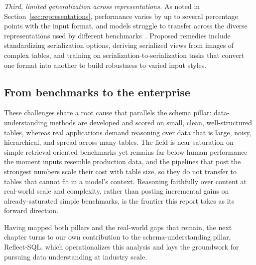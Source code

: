 \emph{Third, limited generalization across representations.} As noted in Section~\ref{sec:representations}, performance varies by up to several percentage points with the input format, and models struggle to transfer across the diverse representations used by different benchmarks~\cite{sui2024table}. Proposed remedies include standardizing serialization options, deriving serialized views from images of complex tables, and training on serialization-to-serialization tasks that convert one format into another to build robustness to varied input styles.

\subsection{From benchmarks to the enterprise}
These challenges share a root cause that parallels the schema pillar: data-understanding methods are developed and scored on small, clean, well-structured tables, whereas real applications demand reasoning over data that is large, noisy, hierarchical, and spread across many tables. The field is near saturation on simple retrieval-oriented benchmarks yet remains far below human performance the moment inputs resemble production data, and the pipelines that post the strongest numbers scale their cost with table size, so they do not transfer to tables that cannot fit in a model's context. Reasoning faithfully over content at real-world scale and complexity, rather than posting incremental gains on already-saturated simple benchmarks, is the frontier this report takes as its forward direction.

Having mapped both pillars and the real-world gaps that remain, the next chapter turns to our own contribution to the schema-understanding pillar, Reflect-SQL, which operationalizes this analysis and lays the groundwork for pursuing data understanding at industry scale.
